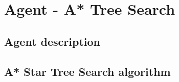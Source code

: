 \section{Agent - A* Tree Search}

\subsection{Agent description}

\subsection{A* Star Tree Search algorithm}


